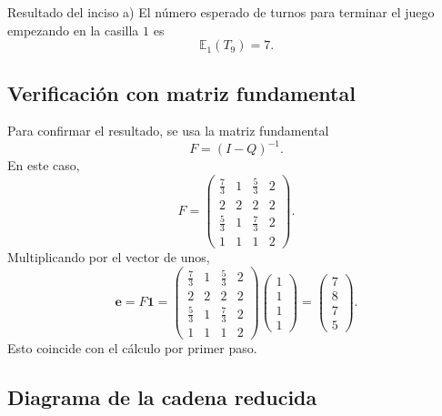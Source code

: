 \documentclass[12pt,a4paper]{article}
\newcommand{\E}{\mathbb{E}}
\theoremstyle{definition}
\begin{document}
\begin{cajaResultado}{Resultado del inciso a)}
El número esperado de turnos para terminar el juego empezando en la casilla \(1\) es
\[
    \boxed{\E_1(T_9)=7.}
\]
\end{cajaResultado}

\subsection{Verificación con matriz fundamental}

Para confirmar el resultado, se usa la matriz fundamental
\[
    F=(I-Q)^{-1}.
\]
En este caso,
\[
F=
\begin{pmatrix}
\frac73 & 1 & \frac53 & 2\\
2 & 2 & 2 & 2\\
\frac53 & 1 & \frac73 & 2\\
1 & 1 & 1 & 2
\end{pmatrix}.
\]
Multiplicando por el vector de unos,
\[
    \mathbf{e}=F\mathbf{1}
    =
\begin{pmatrix}
\frac73 & 1 & \frac53 & 2\\
2 & 2 & 2 & 2\\
\frac53 & 1 & \frac73 & 2\\
1 & 1 & 1 & 2
\end{pmatrix}
\begin{pmatrix}
1\\1\\1\\1
\end{pmatrix}
= 
\begin{pmatrix}
7\\8\\7\\5
\end{pmatrix}.
\]
Esto coincide con el cálculo por primer paso.

\subsection{Diagrama de la cadena reducida}
\end{document}
